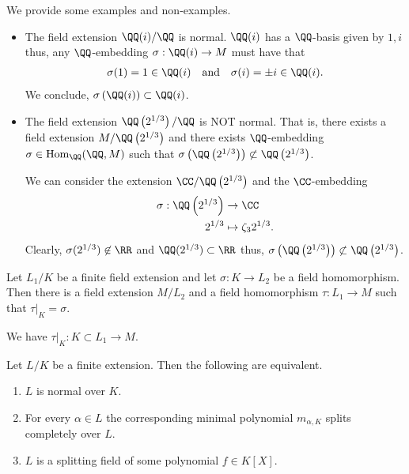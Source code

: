 \documentclass[12pt, a4paper]{article}
\begin{document}
\begin{mdexample}
    We provide some examples and non-examples.
    \begin{itemize}
        \item The field extension \(\QQ(i)/\QQ\) is normal. \(\QQ(i)\) has a \(\QQ\)-basis given by \({1,i}\) thus, any \(\QQ\)-embedding \(\sigma : \QQ(i) \to M\) must have that 
        \[\begin{aligned}
            \sigma(1)=1\in \QQ(i) \quad\text{and}\quad \sigma(i)=\pm i \in \QQ(i).
        \end{aligned}\]
        We conclude, \(\sigma\left( \QQ(i) \right) \subset \QQ(i)\).
        \item The field extension \(\QQ\left( 2^{1/3} \right)/\QQ\) is NOT normal. That is, there exists a field extension \(M/\QQ\left( 2^{1/3} \right)\) and there exists \(\QQ\)-embedding \(\sigma \in \text{Hom}_{\QQ}(\QQ,M)\) such that \(\sigma\left( \QQ\left( 2^{1/3} \right) \right) \not\subset \QQ\left( 2^{1/3} \right)\). 

        We can consider the extension \(\CC/\QQ\left( 2^{1/3} \right)\) and the \(\CC\)-embedding 
        \[\begin{aligned}
            \sigma : \QQ\left( 2^{1/3} \right) &\to \CC \\
            2^{1/3} &\mapsto \zeta_3 2^{1/3}.
        \end{aligned}\]
        Clearly, \(\sigma(2^{1/3}) \not\in \RR\) and \(\QQ(2^{1/3}) \subset \RR\) thus, \(\sigma\left( \QQ\left( 2^{1/3} \right) \right) \not\subset \QQ\left( 2^{1/3} \right)\).
    \end{itemize}
\end{mdexample}

\begin{lemma}
    Let \(L_1/K\) be a finite field extension and let \(\sigma:K\to L_2\) be a field homomorphism. Then there is a field extension \(M/L_2\) and a field homomorphism \(\tau:L_1 \to M\) such that \(\tau\vert_K =\sigma\).
\end{lemma}

\begin{mdnote}
    We have \(\tau\vert_K : K \subset L_1 \to M \).
\end{mdnote}

\begin{mdprop}
    Let \(L/K\) be a finite extension. Then the following are equivalent.
    \begin{enumerate}
        \item \(L\) is normal over \(K\).
        \item For every \(\alpha\in L\) the corresponding minimal polynomial \(m_{\alpha,K}\) splits completely over \(L\).
        \item \(L\) is a splitting field of some polynomial \(f\in K[X]\).
    \end{enumerate}
\end{mdprop}
\end{document}
